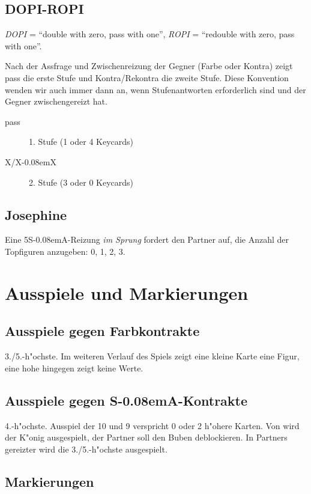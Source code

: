 \documentclass[11pt,german,twocolumn]{scrartcl}
\def\sa{\nobreak\textsf{S\kern-0.08emA}\xspace}
\def\SA{\nobreak\hspace{\cardskip}\sa}
\def\kontra{\textsf{X}\xspace}
\def\rekontra{\textsf{X\kern-0.08emX}\xspace}
\newcommand{\conv}[1]{\emph{#1}}
\def\bdsc{\begin{description}}
\def\edsc{\end{description}}
\newcommand{\Index}[1]{#1\index{#1}}
\begin{document}
\subsection{\Index{DOPI-ROPI}}

\conv{DOPI} = ``double with zero, pass with one'', \conv{ROPI} =
``redouble with zero, pass with one''.

Nach der Assfrage und Zwischenreizung der Gegner (Farbe oder Kontra) zeigt pass
die erste Stufe und Kontra/Rekontra die zweite Stufe. Diese Konvention wenden
wir auch immer dann an, wenn Stufenantworten erforderlich sind und der Gegner
zwischengereizt hat.
%
\bdsc
  \item[pass] 1. Stufe (1 oder 4 Keycards)
  \item[\kontra/\rekontra] 2. Stufe (3 oder 0 Keycards)
\edsc

\subsection{Josephine}

Eine 5\SA-Reizung \emph{im Sprung} fordert den Partner auf, die Anzahl der
Topfiguren anzugeben: 0, 1, 2, 3.

\newpage
\section{Ausspiele und Markierungen}

\subsection{Ausspiele gegen Farbkontrakte}

3./5.-h"ochste. Im weiteren Verlauf des Spiels zeigt eine kleine Karte eine
Figur, eine hohe hingegen zeigt keine Werte.

\subsection{Ausspiele gegen \sa-Kontrakte}

4.-h"ochste. Ausspiel der 10 und 9 verspricht 0 oder 2 h"ohere Karten. Von
 wird der K"onig ausgespielt, der Partner soll den Buben deblockieren. In
Partners gereizter wird die 3./5.-h"ochste ausgespielt.

\subsection{Markierungen}
\end{document}
